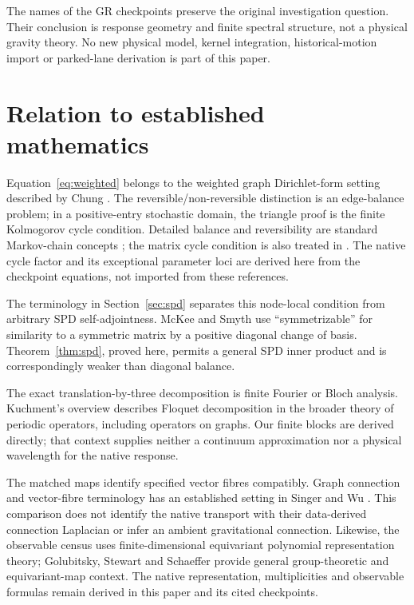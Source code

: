 The names of the GR checkpoints preserve the original investigation question. Their conclusion is response geometry and finite spectral structure, not a physical gravity theory. No new physical model, kernel integration, historical-motion import or parked-lane derivation is part of this paper.

\section{Relation to established mathematics}\label{sec:discussion}
Equation~\eqref{eq:weighted} belongs to the weighted graph Dirichlet-form setting described by Chung \cite[Chapter~1]{Chung}. The reversible/non-reversible distinction is an edge-balance problem; in a positive-entry stochastic domain, the triangle proof is the finite Kolmogorov cycle condition. Detailed balance and reversibility are standard Markov-chain concepts \cite[\S1.6]{LP}; the matrix cycle condition is also treated in \cite[\S4]{MS}. The native cycle factor and its exceptional parameter loci are derived here from the checkpoint equations, not imported from these references.

The terminology in Section~\ref{sec:spd} separates this node-local condition from arbitrary SPD self-adjointness. McKee and Smyth \cite[Definition~4.1]{MS} use ``symmetrizable'' for similarity to a symmetric matrix by a positive diagonal change of basis. Theorem~\ref{thm:spd}, proved here, permits a general SPD inner product and is correspondingly weaker than diagonal balance.

The exact translation-by-three decomposition is finite Fourier or Bloch analysis. Kuchment's overview \cite[\S4]{Kuchment} describes Floquet decomposition in the broader theory of periodic operators, including operators on graphs. Our finite blocks are derived directly; that context supplies neither a continuum approximation nor a physical wavelength for the native response.

The matched maps identify specified vector fibres compatibly. Graph connection and vector-fibre terminology has an established setting in Singer and Wu \cite{SW}. This comparison does not identify the native transport with their data-derived connection Laplacian or infer an ambient gravitational connection. Likewise, the observable census uses finite-dimensional equivariant polynomial representation theory; Golubitsky, Stewart and Schaeffer \cite{GSS} provide general group-theoretic and equivariant-map context. The native representation, multiplicities and observable formulas remain derived in this paper and its cited checkpoints.

